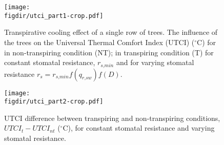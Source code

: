 	
	\begin{figure}[p]
		\centering
		\texttt{[image: \\figdir/utci\_part1-crop.pdf]}
		\caption{Transpirative cooling effect of a single row of trees. The influence of the trees on the Universal Thermal Comfort Index (UTCI) ($^{\circ}$C) for  in non-transpiring condition (NT); in transpiring condition (T) for  constant stomatal resistance, $r_{\textit{s,min}}$ and  for varying stomatal resistance $r_s=r_{\textit{s,min}} f(q_{\textit{r,sw}})f(D)$.}
		\label{fig:utcifield1}
	\end{figure}
	
	
	\begin{figure}[p]
		\centering
		\texttt{[image: \\figdir/utci\_part2-crop.pdf]}
		\caption{UTCI difference between transpiring and non-transpiring conditions, $\textit{UTCI}_t-\textit{UTCI}_{\textit{nt}}$  ($^{\circ}$C), for  constant stomatal resistance and  varying stomatal resistance.}
		\label{fig:utcifield2}
	\end{figure}

